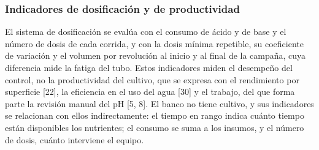 \subsubsection{Indicadores de dosificación y de productividad}\label{sec:indicadores}
El sistema de dosificación se evalúa con el consumo de ácido y de base y el número de dosis de cada corrida, y con la dosis mínima repetible, su coeficiente de variación y el volumen por revolución al inicio y al final de la campaña, cuya diferencia mide la fatiga del tubo. Estos indicadores miden el desempeño del control, no la productividad del cultivo, que se expresa con el rendimiento por superficie [22], la eficiencia en el uso del agua [30] y el trabajo, del que forma parte la revisión manual del pH [5, 8]. El banco no tiene cultivo, y sus indicadores se relacionan con ellos indirectamente: el tiempo en rango indica cuánto tiempo están disponibles los nutrientes; el consumo se suma a los insumos, y el número de dosis, cuánto interviene el equipo.
